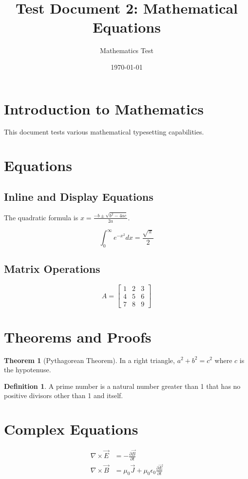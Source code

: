 \documentclass[12pt]{article}
\title{Test Document 2: Mathematical Equations}
\author{Mathematics Test}
\date{\today}
\theoremstyle{definition}
\newtheorem{theorem}{Theorem}
\newtheorem{definition}{Definition}
\begin{document}
\maketitle

\section{Introduction to Mathematics}
This document tests various mathematical typesetting capabilities.

\section{Equations}

\subsection{Inline and Display Equations}
The quadratic formula is $x = \frac{-b \pm \sqrt{b^2 - 4ac}}{2a}$.

\begin{equation}
    \int_{0}^{\infty} e^{-x^2} dx = \frac{\sqrt{\pi}}{2}
\end{equation}

\subsection{Matrix Operations}
\begin{equation}
    A = \begin{bmatrix}
        1 & 2 & 3 \\
        4 & 5 & 6 \\
        7 & 8 & 9
    \end{bmatrix}
\end{equation}

\section{Theorems and Proofs}

\begin{theorem}[Pythagorean Theorem]
In a right triangle, $a^2 + b^2 = c^2$ where $c$ is the hypotenuse.
\end{theorem}

\begin{definition}
A prime number is a natural number greater than 1 that has no positive divisors other than 1 and itself.
\end{definition}

\section{Complex Equations}
\begin{align}
    \nabla \times \vec{E} &= -\frac{\partial \vec{B}}{\partial t} \\
    \nabla \times \vec{B} &= \mu_0 \vec{J} + \mu_0 \epsilon_0 \frac{\partial \vec{E}}{\partial t}
\end{align}
\end{document}
